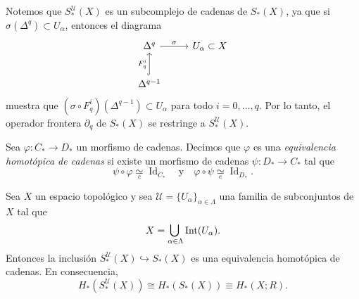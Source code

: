 Notemos que $S_*^{\mathcal{U}}(X)$ es un subcomplejo de cadenas de $S_*(X)$, ya que si $\sigma(\Delta^q) \subset U_\alpha$, entonces el diagrama
\[
\begin{tikzcd}[column sep=2.4em, row sep=2.2em]
\Delta^q \arrow[r, "\sigma"] & U_\alpha \subset X \\
\Delta^{q-1} \arrow[u, hook, "F_q^i"] &
\end{tikzcd}
\]
muestra que $(\sigma \circ F_q^i)(\Delta^{q-1}) \subset U_\alpha$ para todo $i = 0, \dots, q$. Por lo tanto, el operador frontera $\partial_q$ de $S_*(X)$ se restringe a $S_*^{\mathcal{U}}(X)$.

\begin{definicion}
Sea $\varphi \colon C_* \to D_*$ un morfismo de cadenas. Decimos que $\varphi$ es una \textit{equivalencia homotópica de cadenas} si existe un morfismo de cadenas $\psi \colon D_* \to C_*$ tal que
\[
\psi \circ \varphi \underset{c}{\simeq} \operatorname{Id}_{C_*}
\quad \text{y} \quad
\varphi \circ \psi \underset{c}{\simeq} \operatorname{Id}_{D_*}.
\]
\end{definicion}

\begin{teorema}
Sea $X$ un espacio topológico y sea $\mathcal{U} = \{U_\alpha\}_{\alpha \in \Lambda}$ una familia de subconjuntos de $X$ tal que
\[
X = \medcup_{\alpha \in \Lambda} \interior({U}_\alpha).
\]
Entonces la inclusión $S_*^{\mathcal{U}}(X) \hookrightarrow S_*(X)$ es una equivalencia homotópica de cadenas. En consecuencia,
\[
H_*(S_*^{\mathcal{U}}(X)) \cong H_*(S_*(X)) \equiv H_*(X; R).
\]
\end{teorema}


